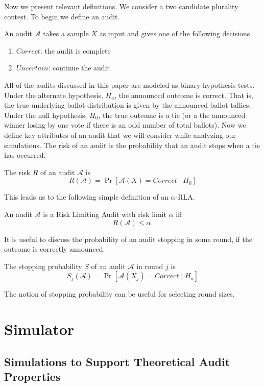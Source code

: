 \documentclass[runningheads]{llncs}
\begin{document}
Now we present relevant definitions.
We consider a two candidate plurality contest.
To begin we define an audit.
\begin{definition}
An audit $\mathcal{A}$ takes a sample $X$ as input and gives one of the 
following decisions
\begin{enumerate}
\item
$Correct$: the audit is complete
\item
$Uncertain$: continue the audit
\end{enumerate}
\end{definition}
All of the audits discussed in this paper are modeled as binary hypothesis tests.
Under the alternate hypothesis, $H_a$, the announced outcome is correct. 
That is, the true underlying ballot distribution is given by the announced ballot tallies.
Under the null hypothesis, $H_0$, the true outcome is a tie 
(or a the announced winner losing by one vote if there is an odd number of total ballots).
Now we define key attributes of an audit that we will consider while analyzing our simulations.
The risk of an audit is the probability that an audit stops when a tie has occurred.
\begin{definition}[Risk]
The risk $R$ of an audit $\mathcal{A}$ is
$$R(\mathcal{A})=\Pr[\mathcal{A}(X)=Correct \mid H_0]$$
\end{definition}
This leads us to the following simple definition of an $\alpha$-RLA.
\begin{definition}
An audit $\mathcal{A}$ is a Risk Limiting Audit with 
risk limit $\alpha$ iff 
$$R(\mathcal{A}) \le \alpha.$$
\end{definition}

It is useful to discuss the probability of an audit stopping in
some round, if the outcome is correctly announced.
\begin{definition}
The stopping probability $S$ of an audit $\mathcal{A}$ in round $j$ is 
$$S_j(\mathcal{A})=\Pr[\mathcal{A}(X_j)=Correct \mid H_a]$$
\end{definition}
The notion of stopping probability can be useful for selecting round sizes.

\section{Simulator}
\subsection{Simulations to Support Theoretical Audit Properties}
\end{document}
